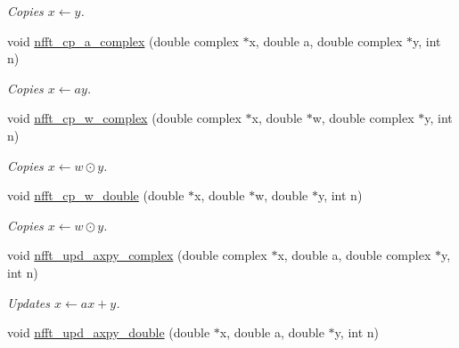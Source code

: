 \begin{CompactItemize}
\begin{CompactList}\small\item\em Copies $x \leftarrow y$. \item\end{CompactList}\item 
\hypertarget{group__nfftutil_ga23}{
void \hyperlink{group__nfftutil_ga23}{nfft\_\-cp\_\-a\_\-complex} (double complex $\ast$x, double a, double complex $\ast$y, int n)}
\label{group__nfftutil_ga23}

\begin{CompactList}\small\item\em Copies $x \leftarrow a y$. \item\end{CompactList}\item 
\hypertarget{group__nfftutil_ga24}{
void \hyperlink{group__nfftutil_ga24}{nfft\_\-cp\_\-w\_\-complex} (double complex $\ast$x, double $\ast$w, double complex $\ast$y, int n)}
\label{group__nfftutil_ga24}

\begin{CompactList}\small\item\em Copies $x \leftarrow w\odot y$. \item\end{CompactList}\item 
\hypertarget{group__nfftutil_ga25}{
void \hyperlink{group__nfftutil_ga25}{nfft\_\-cp\_\-w\_\-double} (double $\ast$x, double $\ast$w, double $\ast$y, int n)}
\label{group__nfftutil_ga25}

\begin{CompactList}\small\item\em Copies $x \leftarrow w\odot y$. \item\end{CompactList}\item 
\hypertarget{group__nfftutil_ga26}{
void \hyperlink{group__nfftutil_ga26}{nfft\_\-upd\_\-axpy\_\-complex} (double complex $\ast$x, double a, double complex $\ast$y, int n)}
\label{group__nfftutil_ga26}

\begin{CompactList}\small\item\em Updates $x \leftarrow a x + y$. \item\end{CompactList}\item 
\hypertarget{group__nfftutil_ga27}{
void \hyperlink{group__nfftutil_ga27}{nfft\_\-upd\_\-axpy\_\-double} (double $\ast$x, double a, double $\ast$y, int n)}
\label{group__nfftutil_ga27}


\end{CompactItemize}

